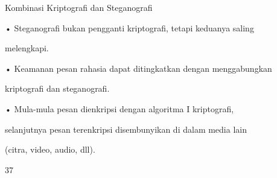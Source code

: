 \documentclass{article}
\begin{document}

Kombinasi Kriptografi dan Steganografi

• Steganografi bukan pengganti kriptografi, tetapi keduanya saling 

melengkapi.

• Keamanan pesan rahasia dapat ditingkatkan dengan menggabungkan 

kriptografi dan steganografi. 

• Mula-mula pesan dienkripsi dengan algoritma I kriptografi, 

selanjutnya pesan terenkripsi disembunyikan di dalam media lain 

(citra, video, audio, dll).

37
\end{document}
